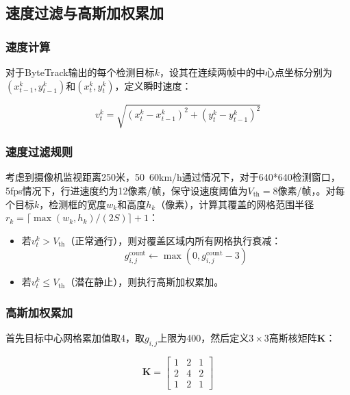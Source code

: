 \documentclass[10.5pt,a4paper,twoside,twocolumn]{ctexart}
\begin{document}
\subsection{速度过滤与高斯加权累加}

\subsubsection{速度计算}

对于ByteTrack输出的每个检测目标$k$，设其在连续两帧中的中心点坐标分别为$(x_{t-1}^k,y_{t-1}^k)$和$(x_t^k,y_t^k)$，定义瞬时速度：

\begin{equation}
v_t^k = \sqrt{(x_t^k - x_{t-1}^k)^2 + (y_t^k - y_{t-1}^k)^2}
\end{equation}

\subsubsection{速度过滤规则}

考虑到摄像机监视距离250米，50~60km/h通过情况下，对于640*640检测窗口，5fps情况下，行进速度约为12像素/帧，保守设速度阈值为$V_{\text{th}}=8$像素/帧，。对每个目标$k$，检测框的宽度$w_k$和高度$h_k$（像素），计算其覆盖的网格范围半径$r_k = \lceil \max(w_k, h_k) / (2S) \rceil + 1$：

\begin{itemize}
\item 若$v_t^k > V_{\text{th}}$（正常通行），则对覆盖区域内所有网格执行衰减：
\begin{equation}
g_{i,j}^{\text{count}} \leftarrow \max(0, g_{i,j}^{\text{count}} - 3)
\end{equation}

\item 若$v_t^k \leq V_{\text{th}}$（潜在静止），则执行高斯加权累加。
\end{itemize}

\subsubsection{高斯加权累加}

首先目标中心网格累加值取4，取$g_{i,j}$上限为400，然后定义$3\times3$高斯核矩阵$\mathbf{K}$：

\begin{equation}
\mathbf{K} = \begin{bmatrix}
1 & 2 & 1 \\
2 & 4 & 2 \\
1 & 2 & 1
\end{bmatrix}
\end{equation}
\end{document}
